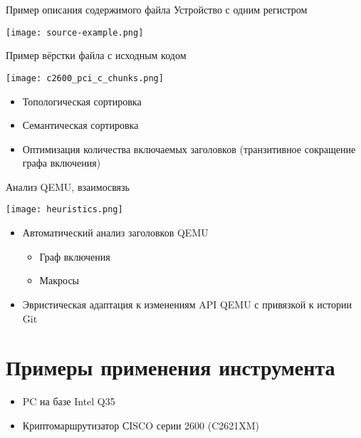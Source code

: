 \documentclass[unicode,hyperref={unicode=true}]{beamer}
\newcommand*{\sectionpagekb}{\usebeamertemplate*{section page kb}}
\theoremstyle{definition}
\theoremstyle{plain}
\begin{document}
\begin{frame}{Пример описания содержимого файла}
Устройство с одним регистром\\
\vfill
\begin{center}
\texttt{[image: source-example.png]}
\end{center}
\end{frame}



\begin{frame}{Пример вёрстки файла с исходным кодом}
\begin{minipage}{0.61\textwidth}
\texttt{[image: c2600\_pci\_c\_chunks.png]}
\end{minipage}
\hfill
\begin{minipage}{0.34\textwidth}
\begin{itemize}
\item Топологическая сортировка
\item Семантическая сортировка
\item Оптимизация количества включаемых заголовков (транзитивное сокращение
графа включения)
\end{itemize}
\end{minipage}
\end{frame}



\begin{frame}{Анализ QEMU, взаимосвязь}
\begin{minipage}{0.35\textwidth}
\texttt{[image: heuristics.png]}
\end{minipage}
\hfill
\begin{minipage}{0.63\textwidth}
\begin{itemize}
\item Автоматический анализ заголовков QEMU
    \begin{itemize}
    \item Граф включения
    \item Макросы
    \end{itemize}
\item Эвристическая адаптация к изменениям API QEMU с привязкой к истории Git
\end{itemize}
\end{minipage}
\end{frame}



\section{Примеры применения инструмента}
\begin{frame}
\sectionpagekb
\begin{itemize}
\item PC на базе Intel Q35
\item Криптомаршрутизатор СISCO серии 2600 (C2621XM)
\end{itemize}
\end{frame}
\end{document}
